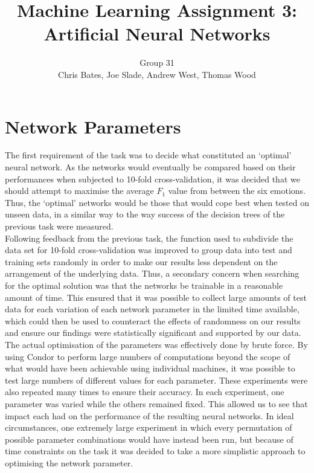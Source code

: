 \documentclass[a4paper]{article}
\title{Machine Learning Assignment 3: Artificial Neural Networks}
\author{Group 31 \\ Chris Bates, Joe Slade, Andrew West, Thomas Wood}
\begin{document}
\maketitle
\section{Network Parameters}


The first requirement of the task was to decide what constituted an `optimal' neural network. As the networks would eventually
be compared based on their performances when subjected to 10-fold cross-validation, it was decided that we should attempt to 
maximise the average $F_1$ value from between the six emotions. Thus, the `optimal' networks would be those that would cope
best when tested on unseen data, in a similar way to the way success of the decision trees of the previous task were measured.\\

Following feedback from the previous task, the function used to subdivide the data set for 10-fold cross-validation was improved
to group data into test and training sets randomly in order to make our results less dependent on the arrangement of the underlying data.
Thus, a secondary concern when searching for the optimal solution was that the networks be trainable in a reasonable amount of time.
This ensured that it was possible to collect large amounts of test data for each variation of each network parameter in the
limited time available, which could then be used to counteract the effects of randomness on our results and ensure our findings
were statistically significant and supported by our data.\\

The actual optimisation of the parameters was effectively done by brute force. By using Condor to perform large numbers of computations
beyond the scope of what would have been achievable using individual machines, it was possible to test large numbers of different values
for each parameter. These experiments were also repeated many times to ensure their accuracy. In each experiment, one parameter was varied
while the others remained fixed. This allowed us to see that impact each had on the performance of the resulting neural networks. In ideal
circumstances, one extremely large experiment in which every permutation of possible parameter combinations would have instead been run,
but because of time constraints on the task it was decided to take a more simplistic approach to optimising the network parameter.\\
\end{document}
